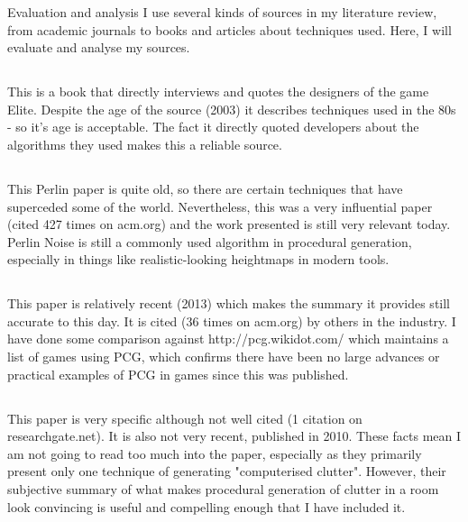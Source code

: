 \documentclass[review]{cmpreport}
\begin{document}
\begin{section}{Evaluation and analysis}
I use several kinds of sources in my literature review, from academic journals to books and articles about techniques used. Here, I will evaluate and analyse my sources.

\subsection{\cite{spufford_2003}}
This is a book that directly interviews and quotes the designers of the game Elite. Despite the age of the source (2003) it describes techniques used in the 80s - so it's age is acceptable. The fact it directly quoted developers about the algorithms they used makes this a reliable source.


\subsection{\cite{Perlin:1985:IS:325165.325247}}
This Perlin paper is quite old, so there are certain techniques that have superceded some of the world. Nevertheless, this was a very influential paper (cited 427 times on acm.org) and the work presented is still very relevant today. Perlin Noise is still a commonly used algorithm in procedural generation, especially in things like realistic-looking heightmaps in modern tools.

\subsection{\cite{Hendrikx:2013:PCG:2422956.2422957}}
This paper is relatively recent (2013) which makes the summary it provides still accurate to this day. It is cited (36 times on acm.org) by others in the industry. I have done some comparison against http://pcg.wikidot.com/ which maintains a list of games using PCG, which confirms there have been no large advances or practical examples of PCG in games since this was published. 

\subsection{\cite{taylor-parberry}}
This paper is very specific although not well cited (1 citation on researchgate.net). It is also not very recent, published in 2010. These facts mean I am not going to read too much into the paper, especially as they primarily present only one technique of generating "computerised clutter". However, their subjective summary of what makes procedural generation of clutter in a room look convincing is useful and compelling enough that I have included it. 

\end{section}



\end{document}
